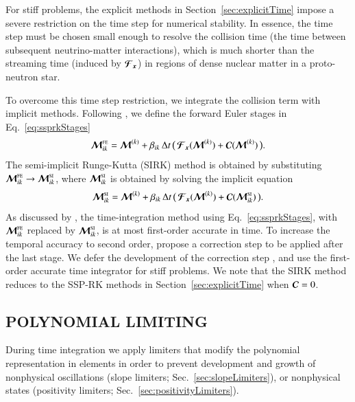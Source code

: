 \documentclass[11pt,letterpaper,twoside,english,final]{article}
\begin{document}
For stiff problems, the explicit methods in Section~\ref{sec:explicitTime} impose a severe restriction on the time step for numerical stability.  
In essence, the time step must be chosen small enough to resolve the collision time (the time between subsequent neutrino-matter interactions), which is much shorter than the streaming time (induced by $\boldsymbol{\mathcal{F}}_{\boldsymbol{x}}$) in regions of dense nuclear matter in a proto-neutron star.  

To overcome this time step restriction, we integrate the collision term with implicit methods.  
Following \citet{chertock_etal_2015}, we define the forward Euler stages in Eq.~\eqref{eq:ssprkStages}
\begin{equation}
  \boldsymbol{\mathcal{M}}_{ik}^{\mbox{\tiny FE}}
  =\boldsymbol{\mathcal{M}}^{(k)}+\beta_{ik}\,\Delta t\,\big(\,\boldsymbol{\mathcal{F}}_{\boldsymbol{x}}(\boldsymbol{\mathcal{M}}^{(k)})+\boldsymbol{\mathcal{C}}(\boldsymbol{\mathcal{M}}^{(k)})\,\big).  
\end{equation}
The semi-implicit Runge-Kutta (SIRK) method is obtained by substituting $\boldsymbol{\mathcal{M}}_{ik}^{\mbox{\tiny FE}}\to\boldsymbol{\mathcal{M}}_{ik}^{\mbox{\tiny SI}}$, where $\boldsymbol{\mathcal{M}}_{ik}^{\mbox{\tiny SI}}$ is obtained by solving the implicit equation
\begin{equation}
  \boldsymbol{\mathcal{M}}_{ik}^{\mbox{\tiny SI}}
  =\boldsymbol{\mathcal{M}}^{(k)}+\beta_{ik}\,\Delta t\,\big(\,\boldsymbol{\mathcal{F}}_{\boldsymbol{x}}(\boldsymbol{\mathcal{M}}^{(k)})+\boldsymbol{\mathcal{C}}(\boldsymbol{\mathcal{M}}_{ik}^{\mbox{\tiny SI}})\,\big).  
\end{equation}
As discussed by \citet{chertock_etal_2015}, the time-integration method using Eq.~\eqref{eq:ssprkStages}, with $\boldsymbol{\mathcal{M}}_{ik}^{\mbox{\tiny FE}}$ replaced by $\boldsymbol{\mathcal{M}}_{ik}^{\mbox{\tiny SI}}$, is at most first-order accurate in time.  
To increase the temporal accuracy to second order, \citet{chertock_etal_2015} propose a correction step to be applied after the last stage.  
We defer the development of the correction step \citep[see, e.g.][]{endeveHauck_2017}, and use the first-order accurate time integrator for stiff problems.  
We note that the SIRK method reduces to the SSP-RK methods in Section~\ref{sec:explicitTime} when $\boldsymbol{\mathcal{C}}=0$.  

\begin{center}
  \section{POLYNOMIAL LIMITING}
  \label{sec:limiters}
\end{center}

During time integration we apply limiters that modify the polynomial representation in elements in order to prevent development and growth of nonphysical oscillations (slope limiters; Sec.~\ref{sec:slopeLimiters}), or nonphysical states (positivity limiters; Sec.~\ref{sec:positivityLimiters}).  
\end{document}
